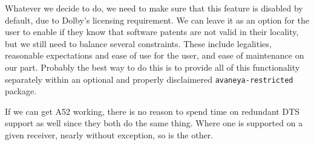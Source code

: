 Whatever we decide to do, we need to make sure that this feature is disabled by default, due to Dolby's licensing requirement. We can leave it as an option for the user to enable if they know that software patents are not valid in their locality, but we still need to balance several constraints. These include legalities, reasonable expectations and ease of use for the user, and ease of maintenance on our part. Probably the best way to do this is to provide all of this functionality separately within an optional and properly disclaimered {\tt avaneya-restricted} package.

If we can get A52 working, there is no reason to spend time on redundant DTS support as well since they both do the same thing. Where one is supported on a given receiver, nearly without exception, so is the other.

